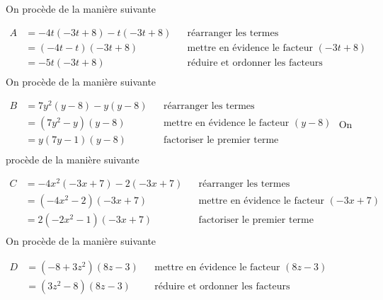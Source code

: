 \documentclass[a4paper,12pt]{report}
\begin{document}
\begin{core}\phantom{ }

\begin{tasks}
\task On procède de la manière suivante 

\medskip
 $\begin{aligned}A&=-4 t(-3 t + 8 )-t(-3 t + 8 )&&\text{réarranger les termes}\\&=(-4 t-t)(-3 t + 8 )&& \text{mettre en évidence le facteur } (-3 t + 8 )\\&={{-5 t(-3 t + 8 )}}&& \text{réduire et ordonner les facteurs}\\\end{aligned}$
\task On procède de la manière suivante 

\medskip
 $\begin{aligned}B&=7 y^2(y-8 )-y(y-8 )&&\text{réarranger les termes}\\&=(7 y^2-y)(y-8 )&& \text{mettre en évidence le facteur } (y-8 )\\&={{y(7 y-1)(y-8 )}}&& \text{factoriser le premier terme}\\\end{aligned}$
\task On procède de la manière suivante 

\medskip
 $\begin{aligned}C&=-4 x^2(-3 x + 7 )-2 (-3 x + 7 )&&\text{réarranger les termes}\\&=(-4 x^2-2 )(-3 x + 7 )&& \text{mettre en évidence le facteur } (-3 x + 7 )\\&={{2 (-2 x^2-1)(-3 x + 7 )}}&& \text{factoriser le premier terme}\\\end{aligned}$
\task On procède de la manière suivante 

\medskip
 $\begin{aligned}D&=(-8  + 3 z^2)(8 z-3 )&& \text{mettre en évidence le facteur } (8 z-3 )\\&={{(3 z^2-8 )(8 z-3 )}}&& \text{réduire et ordonner les facteurs}\\\end{aligned}$
\end{tasks}

\end{core}
\end{document}
